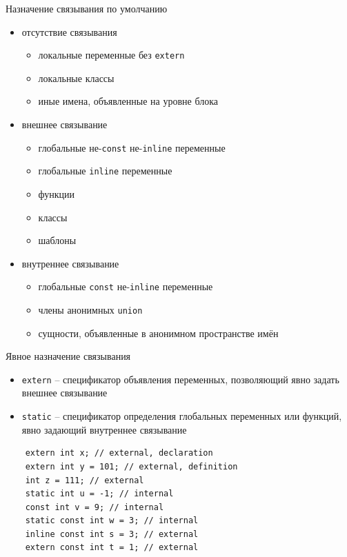 \documentclass[unknownkeysallowed,xcolor=table]{beamer}
\begin{document}
\begin{frame}[fragile]{Назначение связывания по умолчанию}
  \begin{itemize}
    \item отсутствие связывания
      \begin{itemize}
        \item локальные переменные без \lstinline{extern}
        \item локальные классы
        \item иные имена, объявленные на уровне блока
      \end{itemize}
    \item внешнее связывание
      \begin{itemize}
        \item глобальные не-\lstinline{const} не-\lstinline{inline} переменные
        \item глобальные \lstinline{inline} переменные
        \item функции
        \item классы
        \item шаблоны
      \end{itemize}
    \item внутреннее связывание
      \begin{itemize}
        \item глобальные \lstinline{const} не-\lstinline{inline} переменные
        \item члены анонимных \lstinline{union}
        \item сущности, объявленные в анонимном пространстве имён
      \end{itemize}
  \end{itemize}
\end{frame}

\begin{frame}[fragile]{Явное назначение связывания}
  \begin{itemize}
    \item \lstinline{extern} -- спецификатор объявления переменных, позволяющий явно задать внешнее связывание \vspace{0.5em}
    \item \lstinline{static} -- спецификатор определения глобальных переменных или функций, явно задающий внутреннее связывание
  \end{itemize}
  \begin{lstlisting}
    extern int x; // external, declaration
    extern int y = 101; // external, definition
    int z = 111; // external
    static int u = -1; // internal
    const int v = 9; // internal
    static const int w = 3; // internal
    inline const int s = 3; // external
    extern const int t = 1; // external
  \end{lstlisting}
\end{frame}
\end{document}
